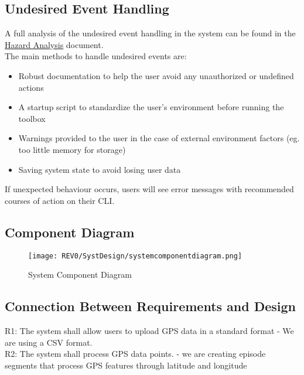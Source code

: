 \documentclass[12pt, titlepage]{article}
\begin{document}
\subsection{Undesired Event Handling}


\noindent A full analysis of the undesired event handling in the system can be found in the \href{../../HazardAnalysis/HazardAnalysis.pdf}{Hazard Analysis} document.\\

\noindent The main methods to handle undesired events are:
\begin{itemize}
    \item Robust documentation to help the user avoid any unauthorized or undefined actions
    \item A startup script to standardize the user's environment before running the toolbox
    \item Warnings provided to the user in the case of external environment factors (eg. too little memory for storage)
    \item Saving system state to avoid losing user data
\end{itemize}

\noindent If unexpected behaviour occurs, users will see error messages with recommended courses of action on their CLI. 

\newpage
\subsection{Component Diagram}
\begin{figure}[!h]
    \centering
    \texttt{[image: REV0/SystDesign/systemcomponentdiagram.png]}
    \caption{System Component Diagram}
    \label{fig:System_Component_Diagram}
\end{figure}

\newpage

\subsection{Connection Between Requirements and Design} \label{SecConnection}
R1: The system shall allow users to upload GPS data in a standard format - We are using a CSV format.\\

\noindent R2: The system shall process GPS data points. - we are creating episode segments that process GPS features through latitude and longitude\\
\end{document}
